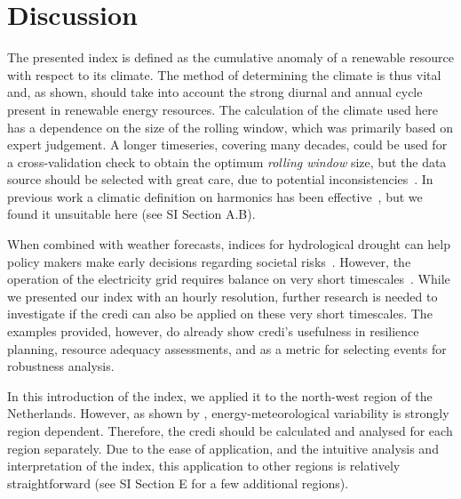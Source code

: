 \documentclass[a4paper,11pt]{extarticle}
\newcommand{\credi}[0]{{\sc credi}}
\begin{document}

\section{Discussion}\label{secCP2:discussion}
The presented index is defined as the cumulative anomaly of a renewable resource with respect to its climate. 
The method of determining the climate is thus vital and, as shown, should take into account the strong diurnal and annual cycle present in renewable energy resources. 
The calculation of the climate used here has a dependence on the size of the rolling window, which was primarily based on expert judgement. 
A longer timeseries, covering many decades, could be used for a cross-validation check to obtain the optimum \emph{rolling window} size, but the data source should be selected with great care, due to potential inconsistencies~\parencite{wohland2019significant,Wohland2022,Deser2023}. 
In previous work a climatic definition on harmonics has been effective~\parencite{Sabziparvar2014,Fischer2019,Rayson2021}, but we found it unsuitable here (see SI Section A.B). 

When combined with weather forecasts, indices for hydrological drought can help policy makers make early decisions regarding societal risks~\parencite{Quiring2009,Stagge2015,Cammalleri2021,vanderWiel2022}. 
However, the operation of the electricity grid requires balance on very short timescales~\parencite{craig2022disconnect,tennet2023}. 
While we presented our index with an hourly resolution, further research is needed to investigate if the \credi{} can also be applied on these very short timescales. 
The examples provided, however, do already show \credi's usefulness in resilience planning, resource adequacy assessments, and as a metric for selecting events for robustness analysis.

In this introduction of the index, we applied it to the north-west region of the Netherlands. 
However, as shown by \textcite{Pickering2020}, energy-meteorological variability is strongly region dependent. 
Therefore, the \credi{} should be calculated and analysed for each region separately. 
Due to the ease of application, and the intuitive analysis and interpretation of the index, this application to other regions is relatively straightforward (see SI Section E for a few additional regions). 


\end{document}
